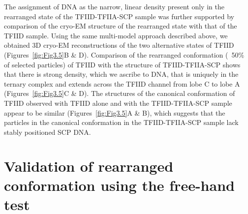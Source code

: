 \indent The assignment of DNA as the narrow, linear density present only in the rearranged state of the TFIID-TFIIA-SCP sample was further supported by comparison of the cryo-EM structure of the rearranged state with that of the TFIID sample. Using the same multi-model approach described above, we obtained 3D cryo-EM reconstructions of the two alternative states of TFIID (Figures~\ref{fig:Fig3.5}B \& D). Comparison of the rearranged conformation (~50\% of selected particles) of TFIID with the structure of TFIID-TFIIA-SCP shows that there is strong density, which we ascribe to DNA, that is uniquely in the ternary complex and extends across the TFIID channel from lobe C to lobe A (Figures~\ref{fig:Fig3.5}C \& D). The structures of the canonical conformation of TFIID observed with TFIID alone and with the TFIID-TFIIA-SCP sample appear to be similar (Figures~\ref{fig:Fig3.5}A \& B), which suggests that the particles in the canonical conformation in the TFIID-TFIIA-SCP sample lack stably positioned SCP DNA.\\

\section{Validation of rearranged conformation using the free-hand test}

